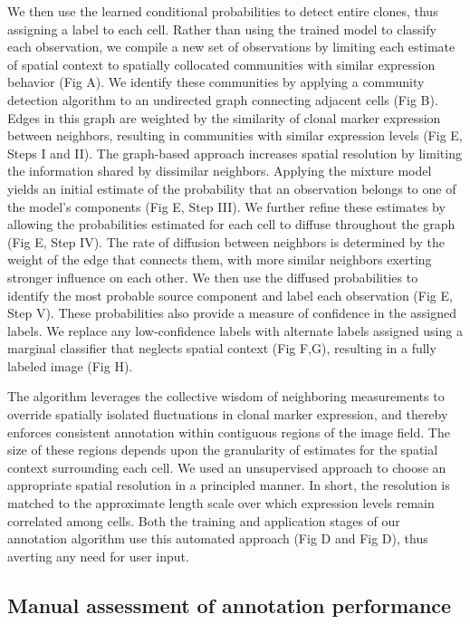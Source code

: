 \documentclass[10pt,letterpaper]{article}
\begin{document}
We then use the learned conditional probabilities to detect entire clones, thus assigning a label to each cell. Rather than using the trained model to classify each observation, we compile a new set of observations by limiting each estimate of spatial context to spatially collocated communities with similar expression behavior (Fig A). We identify these communities by applying a community detection algorithm to an undirected graph connecting adjacent cells (Fig B). Edges in this graph are weighted by the similarity of clonal marker expression between neighbors, resulting in communities with similar expression levels (Fig E, Steps I and II). The graph-based approach increases spatial resolution by limiting the information shared by dissimilar neighbors. Applying the mixture model yields an initial estimate of the probability that an observation belongs to one of the model's components (Fig E, Step III). We further refine these estimates by allowing the probabilities estimated for each cell to diffuse throughout the graph (Fig E, Step IV). The rate of diffusion between neighbors is determined by the weight of the edge that connects them, with more similar neighbors exerting stronger influence on each other. We then use the diffused probabilities to identify the most probable source component and label each observation (Fig E, Step V). These probabilities also provide a measure of confidence in the assigned labels. We replace any low-confidence labels with alternate labels assigned using a marginal classifier that neglects spatial context (Fig F,G), resulting in a fully labeled image (Fig H).

The algorithm leverages the collective wisdom of neighboring measurements to override spatially isolated fluctuations in clonal marker expression, and thereby enforces consistent annotation within contiguous regions of the image field. The size of these regions depends upon the granularity of estimates for the spatial context surrounding each cell. We used an unsupervised approach to choose an appropriate spatial resolution in a principled manner. In short, the resolution is matched to the approximate length scale over which expression levels remain correlated among cells. Both the training and application stages of our annotation algorithm use this automated approach (Fig D and Fig D), thus averting any need for user input.


\subsection*{Manual assessment of annotation performance}
\end{document}

